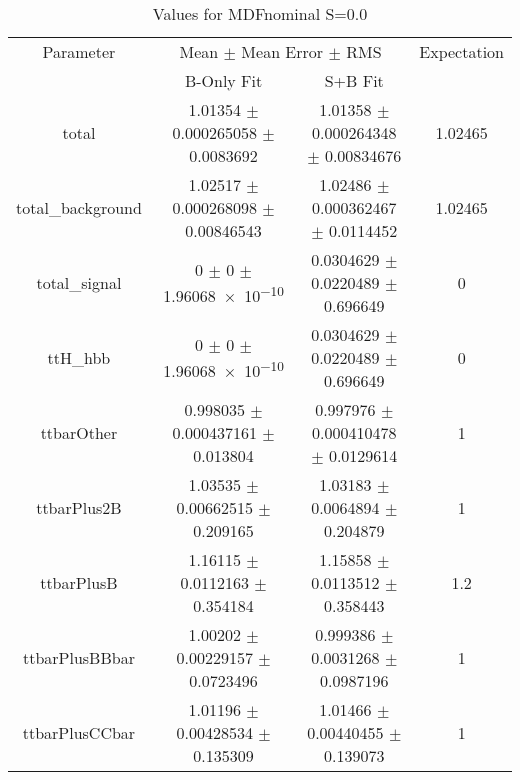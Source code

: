 \begin{table}
\centering
\caption{Values for MDFnominal S=0.0}
\begin{tabular}{cccc}
\toprule
Parameter & \multicolumn{2}{c}{Mean $\pm$ Mean Error $\pm$ RMS} & Expectation\\
 & B-Only Fit & S+B Fit & \\
\midrule
total & \num{1.01354} $\pm$ \num{0.000265058} $\pm$ \num{0.0083692} & \num{1.01358} $\pm$ \num{0.000264348} $\pm$ \num{0.00834676} & \num{1.02465}\\
total\_background & \num{1.02517} $\pm$ \num{0.000268098} $\pm$ \num{0.00846543} & \num{1.02486} $\pm$ \num{0.000362467} $\pm$ \num{0.0114452} & \num{1.02465}\\
total\_signal & \num{0} $\pm$ \num{0} $\pm$ \num{1.96068e-10} & \num{0.0304629} $\pm$ \num{0.0220489} $\pm$ \num{0.696649} & \num{0}\\
ttH\_hbb & \num{0} $\pm$ \num{0} $\pm$ \num{1.96068e-10} & \num{0.0304629} $\pm$ \num{0.0220489} $\pm$ \num{0.696649} & \num{0}\\
ttbarOther & \num{0.998035} $\pm$ \num{0.000437161} $\pm$ \num{0.013804} & \num{0.997976} $\pm$ \num{0.000410478} $\pm$ \num{0.0129614} & \num{1}\\
ttbarPlus2B & \num{1.03535} $\pm$ \num{0.00662515} $\pm$ \num{0.209165} & \num{1.03183} $\pm$ \num{0.0064894} $\pm$ \num{0.204879} & \num{1}\\
ttbarPlusB & \num{1.16115} $\pm$ \num{0.0112163} $\pm$ \num{0.354184} & \num{1.15858} $\pm$ \num{0.0113512} $\pm$ \num{0.358443} & \num{1.2}\\
ttbarPlusBBbar & \num{1.00202} $\pm$ \num{0.00229157} $\pm$ \num{0.0723496} & \num{0.999386} $\pm$ \num{0.0031268} $\pm$ \num{0.0987196} & \num{1}\\
ttbarPlusCCbar & \num{1.01196} $\pm$ \num{0.00428534} $\pm$ \num{0.135309} & \num{1.01466} $\pm$ \num{0.00440455} $\pm$ \num{0.139073} & \num{1}\\
\bottomrule
\end{tabular}
\end{table}